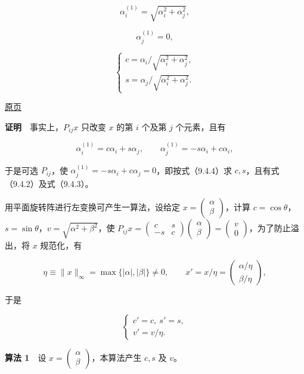 \documentclass[
  10pt,
  fontset=fandol]{ctexart}
\begin{document}
\[
\alpha_i^{(1)}=\sqrt{\alpha_i^2+\alpha_j^2},
\tag{9.4.2}
\]

\[
\alpha_j^{(1)}=0,
\tag{9.4.3}
\]

\[
\begin{cases}
c=\alpha_i/\sqrt{\alpha_i^2+\alpha_j^2},\\
s=\alpha_j/\sqrt{\alpha_i^2+\alpha_j^2}.
\end{cases}
\tag{9.4.4}
\]

\href{../../source-images/pdf-251.jpeg}{原页}

\textbf{证明}　事实上，\(P_{ij}x\) 只改变 \(x\) 的第 \(i\) 个及第 \(j\) 个元素，且有

\[
\alpha_i^{(1)}=c\alpha_i+s\alpha_j,\qquad
\alpha_j^{(1)}=-s\alpha_i+c\alpha_i,
\]

于是可选 \(P_{ij}\)，使 \(\alpha_j^{(1)}=-s\alpha_i+c\alpha_j=0\)，即按式（9.4.4）求 \(c,s\)，且有式（9.4.2）及式（9.4.3）。

用平面旋转阵进行左变换可产生一算法，设给定 \(x=\begin{pmatrix}\alpha\\\beta\end{pmatrix}\)，计算 \(c=\cos\theta\)，\(s=\sin\theta\)，\(v=\sqrt{\alpha^2+\beta^2}\)，使 \(P_{ij}x=\begin{pmatrix}c&s\\-s&c\end{pmatrix}\begin{pmatrix}\alpha\\\beta\end{pmatrix}=\begin{pmatrix}v\\0\end{pmatrix}\)，为了防止溢出，将 \(x\) 规范化，有

\[
\eta\equiv\|x\|_\infty=\max\{|\alpha|,|\beta|\}\ne0,\qquad
x'=x/\eta=\begin{pmatrix}\alpha/\eta\\\beta/\eta\end{pmatrix},
\]

于是

\[
\begin{cases}c'=c,\ s'=s,\\v'=v/\eta.\end{cases}
\]

\textbf{算法 1}　设 \(x=\begin{pmatrix}\alpha\\\beta\end{pmatrix}\)，本算法产生 \(c,s\) 及 \(v\)。
\end{document}
